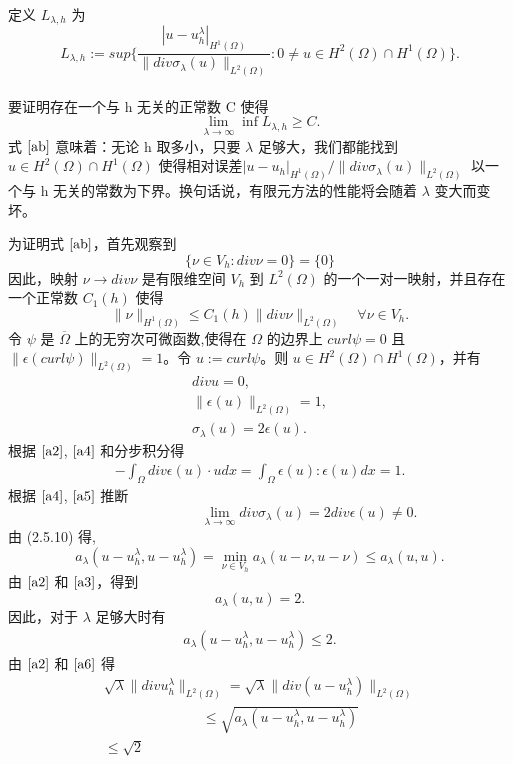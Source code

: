 \documentclass[a4paper,UTF8,titlepage]{ctexart}
\begin{document}
	定义 $L_{\lambda,h}$ 为
	$$
	L_{\lambda,h} := sup \{ \frac{|u-u_h^{\lambda}|_{H^1(\Omega)}}{\| div \sigma_{\lambda}(u) \|_{L^2(\Omega)}} : 0 \ne u \in H^2(\Omega) \cap H^1(\Omega) \}.
	$$
	\\ 
	要证明存在一个与 h 无关的正常数 C 使得
	\begin{equation}
	\lim\limits_{\lambda \to \infty} \inf L_{\lambda,h} \ge C . \label{ab}
	\end{equation}
	式 $\eqref{ab}$ 意味着：无论 h 取多小，只要 $\lambda$ 足够大，我们都能找到 $u \in H^2(\Omega) \cap H^1(\Omega)$ 使得相对误差$ |u-u_h|_{H^1(\Omega)} / \| div \sigma_{\lambda}(u) \|_{L^2(\Omega)} $ 以一个与 h 无关的常数为下界。换句话说，有限元方法的性能将会随着 $\lambda$ 变大而变坏。
	\par
	为证明式 $\eqref{ab}$，首先观察到
	$$
	\{ \nu \in V_h : div \nu = 0 \} = \{ 0 \}
	$$
	因此，映射 $\nu \to div \nu$ 是有限维空间 $V_h$ 到 $L^2(\Omega)$ 的一个一对一映射，并且存在一个正常数 $C_1(h)$ 使得
	$$
	\| \nu \|_{H^1(\Omega)} \le C_1(h) \| div \nu \|_{L^2(\Omega)} \quad \forall \nu \in V_h.
	$$
	令 $\psi$ 是 $\overline{\Omega}$ 上的无穷次可微函数,使得在 $\Omega$ 的边界上 $curl \psi = 0$ 且 $\| \epsilon(curl \psi) \|_{L^2(\Omega)} = 1$。令 $u := curl \psi$。则 $u \in H^2(\Omega) \cap H^1(\Omega)$，并有
	\begin{align}	
	div u = 0, \label{a2} \\
	\| \epsilon(u) \|_{L^2(\Omega)} = 1, \label{a3}\\
	\sigma_{\lambda}(u) = 2 \epsilon(u).  \label{a4}
	\end{align}
	根据 $\eqref{a2}$, $\eqref{a4}$ 和分步积分得
	\begin{align}
	- \int_{\Omega} div \epsilon(u) \cdot u dx = \int_{\Omega} \epsilon(u) : \epsilon(u) dx = 1. \label{a5}
	\end{align}
	根据 $\eqref{a4}$, $\eqref{a5}$ 推断
	$$
	\quad \quad \quad \quad \quad \quad \quad
	\lim\limits_{\lambda \to \infty} div \sigma_{\lambda}(u) = 2 div \epsilon(u) \ne 0. 
	$$
	由 (2.5.10) 得,
	$$
	a_{\lambda}(u-u_h^{\lambda}, u-u_h^{\lambda}) = \min\limits_{\nu \in V_h} a_{\lambda}(u-\nu,u-\nu) \le a_{\lambda}(u,u).
	$$
	由 $\eqref{a2}$ 和 $\eqref{a3}$，得到
	$$
	a_{\lambda}(u,u) = 2.
	$$
	因此，对于 $\lambda$ 足够大时有
	\begin{align} 
	a_{\lambda} (u-u_h^{\lambda}, u-u_h^{\lambda}) \le 2. \label{a6}
	\end{align}
	由 $\eqref{a2}$ 和 $\eqref{a6}$ 得
	\\
	$$
	\begin{matrix}
		\sqrt{\lambda} \| div u_h^{\lambda} \|_{L^2(\Omega)} = \sqrt{\lambda} \| div(u-u_h^{\lambda}) \|_{L^2(\Omega)} \\ 
		\quad \quad \quad \quad \quad \quad \quad
		\le \sqrt{a_{\lambda}(u-u_h^{\lambda}, u-u_h^{\lambda})} \\
		\le \sqrt{2}	
	\end{matrix}
	$$
\end{document}
